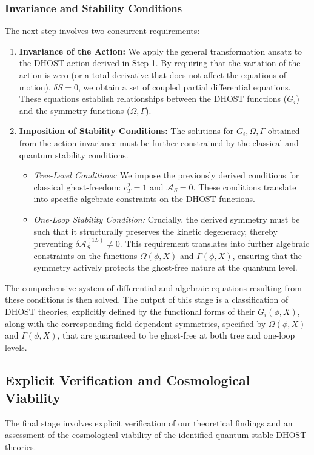 \documentclass[twocolumn]{aastex631}
\begin{document}
\subsubsection{Invariance and Stability Conditions}
The next step involves two concurrent requirements:
\begin{enumerate}
    \item \textbf{Invariance of the Action:} We apply the general transformation ansatz to the DHOST action derived in Step 1. By requiring that the variation of the action is zero (or a total derivative that does not affect the equations of motion), $\delta S = 0$, we obtain a set of coupled partial differential equations. These equations establish relationships between the DHOST functions ($G_i$) and the symmetry functions ($\Omega, \Gamma$).
    \item \textbf{Imposition of Stability Conditions:} The solutions for $G_i, \Omega, \Gamma$ obtained from the action invariance must be further constrained by the classical and quantum stability conditions.
    \begin{itemize}
        \item \textit{Tree-Level Conditions:} We impose the previously derived conditions for classical ghost-freedom: $c_T^2=1$ and $\mathcal{A}_S=0$. These conditions translate into specific algebraic constraints on the DHOST functions.
        \item \textit{One-Loop Stability Condition:} Crucially, the derived symmetry must be such that it structurally preserves the kinetic degeneracy, thereby preventing $\delta\mathcal{A}_S^{(1L)} \neq 0$. This requirement translates into further algebraic constraints on the functions $\Omega(\phi, X)$ and $\Gamma(\phi, X)$, ensuring that the symmetry actively protects the ghost-free nature at the quantum level.
    \end{itemize}
\end{enumerate}
The comprehensive system of differential and algebraic equations resulting from these conditions is then solved. The output of this stage is a classification of DHOST theories, explicitly defined by the functional forms of their $G_i(\phi, X)$, along with the corresponding field-dependent symmetries, specified by $\Omega(\phi, X)$ and $\Gamma(\phi, X)$, that are guaranteed to be ghost-free at both tree and one-loop levels.

\subsection{Explicit Verification and Cosmological Viability}
The final stage involves explicit verification of our theoretical findings and an assessment of the cosmological viability of the identified quantum-stable DHOST theories.
\end{document}
